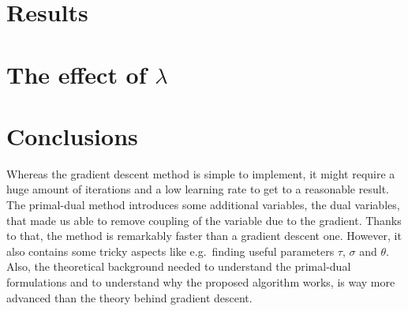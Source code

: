 \documentclass{paper}
\begin{document}
\section{Results}

\section{The effect of $\lambda$}
\section{Conclusions}
Whereas the gradient descent method is simple to implement, it might require a huge amount of iterations and a low learning rate to get to a reasonable result. 
The primal-dual method introduces some additional variables, the dual variables, that made us able to remove coupling of the variable due to the gradient. 
Thanks to that, the method is remarkably faster than a gradient descent one. 
However, it also contains some tricky aspects like e.g.\ finding useful parameters $\tau$, $\sigma$ and $\theta$. 
Also, the theoretical background needed to understand the primal-dual formulations and to understand why the proposed algorithm works, is way more advanced than the theory behind gradient descent.
\end{document}
